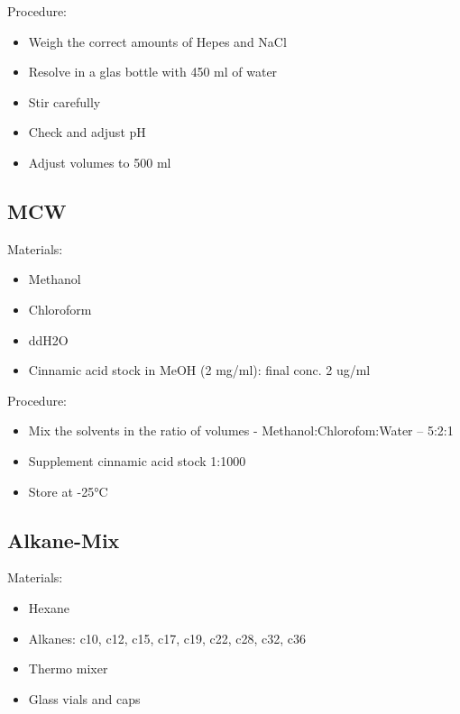 \documentclass[]{book}
\providecommand{\tightlist}{%
  \setlength{\itemsep}{0pt}\setlength{\parskip}{0pt}}
\theoremstyle{definition}
\theoremstyle{definition}
\theoremstyle{definition}
\theoremstyle{remark}
\begin{document}
Procedure:

\begin{itemize}
\tightlist
\item
  Weigh the correct amounts of Hepes and NaCl
\item
  Resolve in a glas bottle with 450 ml of water
\item
  Stir carefully
\item
  Check and adjust pH
\item
  Adjust volumes to 500 ml
\end{itemize}

\hypertarget{mcw}{\subsection{MCW}\label{mcw}}

Materials:

\begin{itemize}
\tightlist
\item
  Methanol
\item
  Chloroform
\item
  ddH2O
\item
  Cinnamic acid stock in MeOH (2 mg/ml): final conc. 2 ug/ml
\end{itemize}

Procedure:

\begin{itemize}
\tightlist
\item
  Mix the solvents in the ratio of volumes - Methanol:Chlorofom:Water --
  5:2:1
\item
  Supplement cinnamic acid stock 1:1000
\item
  Store at -25°C
\end{itemize}

\hypertarget{alkanemix}{\subsection{Alkane-Mix}\label{alkanemix}}

Materials:

\begin{itemize}
\tightlist
\item
  Hexane
\item
  Alkanes: c10, c12, c15, c17, c19, c22, c28, c32, c36
\item
  Thermo mixer
\item
  Glass vials and caps
\end{itemize}
\end{document}
